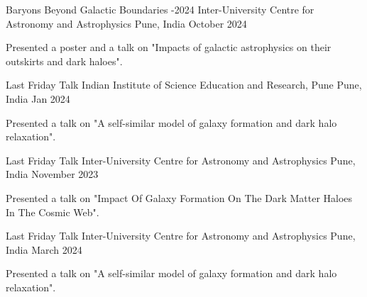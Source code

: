 \begin{cventries}
{
\cventry
{Baryons Beyond Galactic Boundaries -2024}
{Inter-University Centre for Astronomy and Astrophysics}
{Pune, India}
{October 2024}
{
\begin{cvitems}
\item {Presented a poster and a talk on "Impacts of galactic astrophysics on their outskirts and dark haloes".}
\end{cvitems}
}
}



{
\cventry
{Last Friday Talk}
{Indian Institute of Science Education and Research, Pune}
{Pune, India}
{Jan 2024}
{
\begin{cvitems}
\item {Presented a talk on "A self-similar model of galaxy 
formation and dark halo relaxation".}
\end{cvitems}
}
}

{
\cventry
{Last Friday Talk}
{Inter-University Centre for Astronomy and Astrophysics}
{Pune, India}
{November 2023}
{
\begin{cvitems}
\item {Presented a talk on "Impact Of Galaxy Formation On The Dark Matter Haloes In The Cosmic Web".}
\end{cvitems}
}
}

{
\cventry
{Last Friday Talk}
{Inter-University Centre for Astronomy and Astrophysics}
{Pune, India}
{March 2024}
{
\begin{cvitems}
\item {Presented a talk on "A self-similar model of galaxy 
formation and dark halo relaxation".}
\end{cvitems}
}
}

\end{cventries}